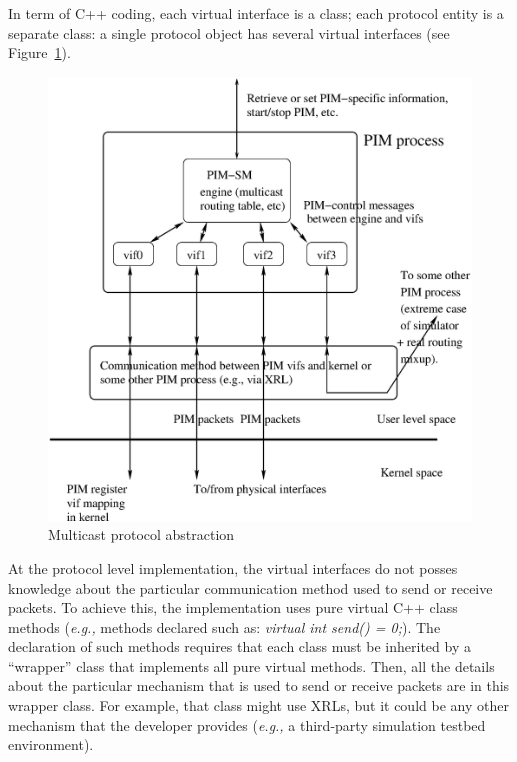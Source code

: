 \documentclass[11pt]{article}
\newcommand{\eg}{\emph{e.g.,}\xspace}
\begin{document}
In term of C++ coding, each virtual interface is a class; each protocol
entity is a separate class: a single protocol object has several virtual
interfaces (see Figure~\ref{fig:mcast_proto_abstraction}).

\begin{figure}[htbp]
  \begin{center}
    \includegraphics[width=5.0in]{figs/mcast_proto_abstraction}
    \caption{Multicast protocol abstraction}
    \label{fig:mcast_proto_abstraction}
  \end{center}
\end{figure}

At the protocol level implementation, the virtual interfaces do not
posses knowledge about the particular communication method used to send
or receive packets. To achieve this, the implementation uses pure
virtual C++ class methods (\eg methods declared such as:
{\it virtual int send() = 0;}).
The declaration of such methods requires that each class must be
inherited by a ``wrapper'' class that implements all pure virtual
methods. Then, all the details about the particular mechanism
that is used to send or receive packets are in this wrapper class.
For example, that class might use XRLs, but it could be any other
mechanism that the developer provides (\eg a third-party simulation
testbed environment).
\end{document}
